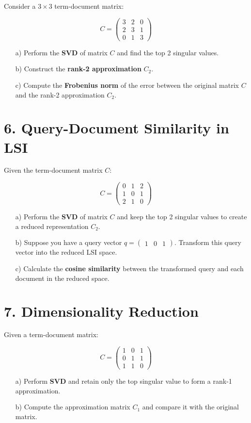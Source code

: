 \documentclass{article}
\begin{document}
Consider a \( 3 \times 3 \) term-document matrix:

\[
C = \begin{pmatrix}
3 & 2 & 0 \\
2 & 3 & 1 \\
0 & 1 & 3
\end{pmatrix}
\]

\begin{enumerate}
    \item[a)] Perform the \textbf{SVD} of matrix \( C \) and find the top 2 singular values.
    \item[b)] Construct the \textbf{rank-2 approximation} \( C_2 \).
    \item[c)] Compute the \textbf{Frobenius norm} of the error between the original matrix \( C \) and the rank-2 approximation \( C_2 \).
\end{enumerate}

\section*{6. Query-Document Similarity in LSI}

Given the term-document matrix \( C \):

\[
C = \begin{pmatrix}
0 & 1 & 2 \\
1 & 0 & 1 \\
2 & 1 & 0
\end{pmatrix}
\]

\begin{enumerate}
    \item[a)] Perform the \textbf{SVD} of matrix \( C \) and keep the top 2 singular values to create a reduced representation \( C_2 \).
    \item[b)] Suppose you have a query vector \( q = \begin{pmatrix} 1 & 0 & 1 \end{pmatrix} \). Transform this query vector into the reduced LSI space.
    \item[c)] Calculate the \textbf{cosine similarity} between the transformed query and each document in the reduced space.
\end{enumerate}

\section*{7. Dimensionality Reduction}

Given a term-document matrix:

\[
C = \begin{pmatrix}
1 & 0 & 1 \\
0 & 1 & 1 \\
1 & 1 & 0
\end{pmatrix}
\]

\begin{enumerate}
    \item[a)] Perform \textbf{SVD} and retain only the top singular value to form a rank-1 approximation.
    \item[b)] Compute the approximation matrix \( C_1 \) and compare it with the original matrix.
\end{enumerate}
\end{document}
